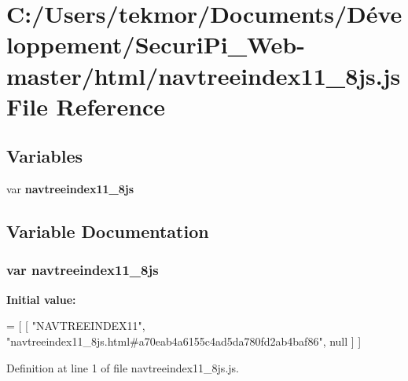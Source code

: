 \section{C\+:/\+Users/tekmor/\+Documents/\+Développement/\+Securi\+Pi\+\_\+\+Web-\/master/html/navtreeindex11\+\_\+8js.js File Reference}
\label{navtreeindex11__8js_8js}
\subsection*{Variables}
\begin{DoxyCompactItemize}
\item 
var {\bf navtreeindex11\+\_\+8js}
\end{DoxyCompactItemize}


\subsection{Variable Documentation}
\subsubsection[{navtreeindex11\+\_\+8js}]{\setlength{\rightskip}{0pt plus 5cm}var navtreeindex11\+\_\+8js}\label{navtreeindex11__8js_8js_ab8ab49ca97e27a7c51aa510c8811b9d8}
{\bfseries Initial value\+:}
\begin{DoxyCode}
=
[
    [ \textcolor{stringliteral}{"NAVTREEINDEX11"}, \textcolor{stringliteral}{"navtreeindex11\_8js.html#a70eab4a6155c4ad5da780fd2ab4baf86"}, null ]
]
\end{DoxyCode}


Definition at line 1 of file navtreeindex11\+\_\+8js.\+js.

